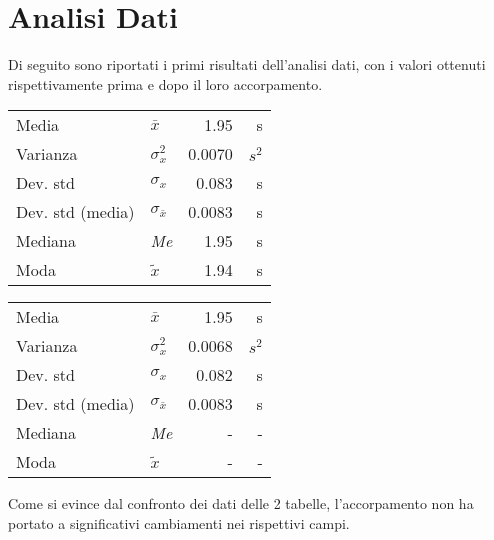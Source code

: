 \documentclass{article}
\begin{document}
\section{Analisi Dati}

Di seguito sono riportati i primi risultati dell'analisi dati, con i valori ottenuti rispettivamente prima e dopo il loro accorpamento. 

\vspace{0.4cm}

\hspace{0.6cm}
    \begin{minipage}[c]{0.45\textwidth}
    	\centering 
        \begin{tabular}{llrr}
        	\toprule
            Media & $\bar{x}$ & 1.95 & s \\
            Varianza & $\sigma^2_x$ & 0.0070 & $s^2$ \\
            Dev. std & $\sigma_x$ & 0.083 & s \\
            Dev. std (media) & $\sigma_{\bar{x}}$ & 0.0083 & s \\
            Mediana & \textit{Me} & 1.95 & s \\
            Moda & $\tilde{x}$ & 1.94 & s \\
            \bottomrule 
        \end{tabular}
    \end{minipage}%
    \begin{minipage}[c]{0.45\textwidth}
    	\centering
        \begin{tabular}{llrr}
        	\toprule
            Media & $\bar{x}$ & 1.95 & s \\
            Varianza & $\sigma^2_x$ & 0.0068 & $s^2$ \\
            Dev. std & $\sigma_x$ & 0.082 & s \\
            Dev. std (media) & $\sigma_{\bar{x}}$ & 0.0083 & s \\
            Mediana & \textit{Me} & - & - \\
            Moda & $\tilde{x}$ & - & - \\
            \bottomrule
        \end{tabular}
    \end{minipage}
    \vspace{0.4cm}

\noindent Come si evince dal confronto dei dati delle 2 tabelle, l'accorpamento non ha portato a significativi cambiamenti nei rispettivi campi.
\end{document}
